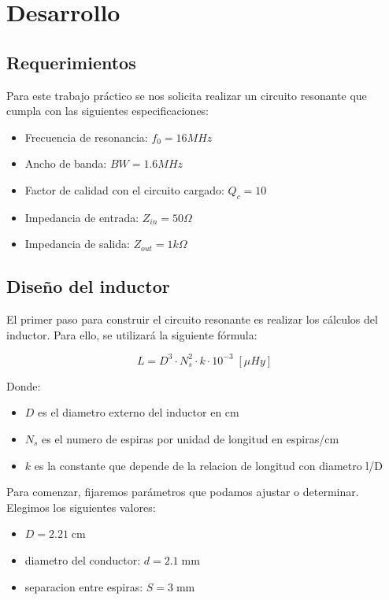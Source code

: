 \section{Desarrollo}

\subsection{Requerimientos}

Para este trabajo práctico se nos solicita realizar un circuito resonante que cumpla con las siguientes especificaciones:

\begin{itemize}
    \item Frecuencia de resonancia: $f_0 = 16 MHz$
    \item Ancho de banda: $BW = 1.6 MHz$
    \item Factor de calidad con el circuito cargado: $Q_c = 10$
    \item Impedancia de entrada: $Z_{in} = 50 \Omega$
    \item Impedancia de salida: $Z_{out} = 1 k\Omega$
\end{itemize}

\subsection{Diseño del inductor}

El primer paso para construir el circuito resonante es realizar los cálculos del inductor. Para ello, se utilizará la siguiente fórmula:

\begin{equation}
    L = D^3 \cdot N_s^2 \cdot k \cdot 10^{-3}\; [\mu Hy]
\end{equation}

Donde:

\begin{itemize}
    \item $D$ es el diametro externo del inductor en cm 
    \item $N_s$ es el numero de espiras por unidad de longitud en espiras/cm
    \item $k$ es la constante que depende de la relacion de longitud con diametro l/D
\end{itemize}

Para comenzar, fijaremos parámetros que podamos ajustar o determinar. Elegimos los siguientes valores:

\begin{itemize}
    \item $D =  2.21\; \text{cm}$
    \item diametro del conductor: $d = 2.1\; \text{mm}$
    \item separacion entre espiras: $S = 3\; \text{mm}$
\end{itemize}

